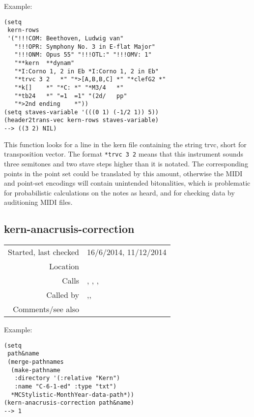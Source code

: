 \vspace{0.5cm}
\noindent Example:
\begin{verbatim}
(setq
 kern-rows
 '("!!!COM: Beethoven, Ludwig van"
   "!!!OPR: Symphony No. 3 in E-flat Major"
   "!!!ONM: Opus 55" "!!!OTL:" "!!!OMV: 1"
   "**kern	**dynam"
   "*I:Corno 1, 2 in Eb	*I:Corno 1, 2 in Eb"
   "*trvc 3 2	*" "*>[A,B,B,C]	*" "*clefG2	*"
   "*k[]	*" "*C:	*" "*M3/4	*"
   "*tb24	*" "=1	=1" "(2d/	pp"
   "*>2nd ending	*"))
(setq staves-variable '(((0 1) (-1/2 1)) 5))
(header2trans-vec kern-rows staves-variable)
--> ((3 2) NIL)
\end{verbatim}

\noindent This function looks for a line in the kern
file containing the string trvc, short for
transposition vector. The format \verb+*trvc 3 2+
means that this instrument sounds three semitones and
two stave steps higher than it is notated. The
corresponding points in the point set could be
translated by this amount, otherwise the MIDI and
point-set encodings will contain unintended
bitonalities, which is problematic for probabilistic
calculations on the notes as heard, and for checking
data by auditioning MIDI files.


\subsection*{kern-anacrusis-correction}\label{fun:kern-anacrusis-correction}

\vspace{0.3cm}
\begin{tabular}{r|p{8cm}}
Started, last checked & 16/6/2014, 11/12/2014 \\
Location & \nameref{sec:kern-by-col} \\
Calls & \nameref{fun:kern-col2dataset-no-tie-resolution}, \nameref{fun:kern-col2rest-set}, \nameref{fun:read-from-file-arbitrary}, \nameref{fun:tab-separated-string2list} \\
Called by & \nameref{fun:kern-file2dataset-by-col},\newline \nameref{fun:kern-transp-file2dataset-by-col},\newline \nameref{fun:kern-file2points-artic-dynam-lyrics} \\
Comments/see also &
\end{tabular}

\vspace{0.5cm}
\noindent Example:
\begin{verbatim}
(setq
 path&name
 (merge-pathnames
  (make-pathname
   :directory '(:relative "Kern")
   :name "C-6-1-ed" :type "txt")
  *MCStylistic-MonthYear-data-path*))
(kern-anacrusis-correction path&name)
--> 1
\end{verbatim}

